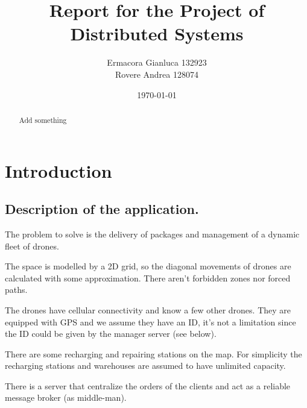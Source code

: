 \documentclass[a4paper, oneside]{memoir}
\title{Report for the Project of Distributed Systems}
\author{Ermacora Gianluca 132923\\ Rovere Andrea 128074}
\date{\today}
\begin{document}
\begin{titlingpage}
\maketitle
\begin{abstract}
Add something
\end{abstract}
\end{titlingpage}

\chapter{Introduction}\label{ch:intro}


\section{Description of the application.}
The problem to solve is the delivery of packages and management of a dynamic fleet of drones.

The space is modelled by a 2D grid, so the diagonal movements of drones are calculated with some approximation. There aren't forbidden zones nor forced paths.

The drones have cellular connectivity and know a few other drones. They are equipped with GPS and we assume they have an ID, it's not a limitation since the ID could be given by the manager server (see below).

There are some recharging and repairing stations on the map. For simplicity the recharging stations and warehouses are assumed to have unlimited capacity.

There is a server that centralize the orders of the clients and act as a reliable message broker (as middle-man).
\end{document}
